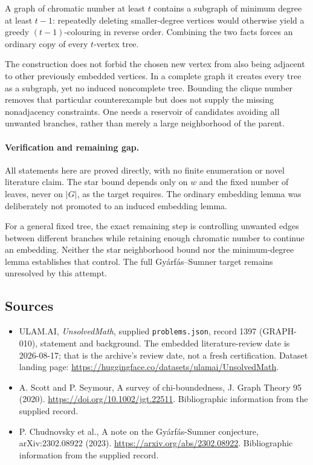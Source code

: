 \documentclass[11pt,a4paper]{article}
\begin{document}
A graph of chromatic number at least $t$ contains a subgraph of minimum degree at least $t-1$: repeatedly deleting smaller-degree vertices would otherwise yield a greedy $(t-1)$-colouring in reverse order. Combining the two facts forces an ordinary copy of every $t$-vertex tree.

The construction does not forbid the chosen new vertex from also being adjacent to other previously embedded vertices. In a complete graph it creates every tree as a subgraph, yet no induced noncomplete tree. Bounding the clique number removes that particular counterexample but does not supply the missing nonadjacency constraints. One needs a reservoir of candidates avoiding all unwanted branches, rather than merely a large neighborhood of the parent.

\paragraph{Verification and remaining gap.}
All statements here are proved directly, with no finite enumeration or novel literature claim. The star bound depends only on $w$ and the fixed number of leaves, never on $|G|$, as the target requires. The ordinary embedding lemma was deliberately not promoted to an induced embedding lemma.

For a general fixed tree, the exact remaining step is controlling unwanted edges between different branches while retaining enough chromatic number to continue an embedding. Neither the star neighborhood bound nor the minimum-degree lemma establishes that control. The full Gy\'arf\'as--Sumner target remains unresolved by this attempt.

\subsection{Sources}

{\small

\begin{itemize}

\item[\hypertarget{source:1397:1}{S1}] ULAM.AI, \emph{UnsolvedMath}, supplied \texttt{problems.json}, record 1397 (GRAPH-010), statement and background. The embedded literature-review date is 2026-08-17; that is the archive’s review date, not a fresh certification. Dataset landing page: \url{https://huggingface.co/datasets/ulamai/UnsolvedMath}.

\item[\hypertarget{source:1397:2}{S2}] A. Scott and P. Seymour, A survey of chi-boundedness, J. Graph Theory 95 (2020). \url{https://doi.org/10.1002/jgt.22511}. Bibliographic information from the supplied record.

\item[\hypertarget{source:1397:3}{S3}] P. Chudnovsky et al., A note on the Gyárfás-Sumner conjecture, arXiv:2302.08922 (2023). \url{https://arxiv.org/abs/2302.08922}. Bibliographic information from the supplied record.

\end{itemize}

}

\label{end:1397}
\end{document}
